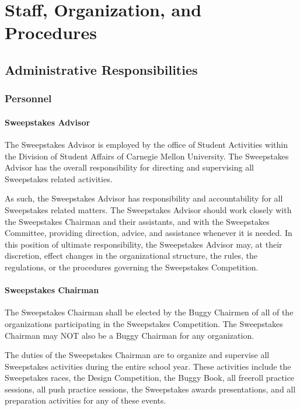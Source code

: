 \chapter{Staff, Organization, and Procedures}

\section{Administrative Responsibilities}

\subsection{Personnel}

\subsubsection{Sweepstakes Advisor}

	The Sweepstakes Advisor is employed by the office of Student Activities within the Division of Student Affairs of Carnegie Mellon University. The Sweepstakes Advisor has the overall responsibility for directing and supervising all Sweepstakes related activities.

	As such, the Sweepstakes Advisor has responsibility and accountability for all Sweepstakes related matters. The Sweepstakes Advisor should work closely with the Sweepstakes Chairman and their assistants, and with the Sweepstakes Committee, providing direction, advice, and assistance whenever it is needed. In this position of ultimate responsibility, the Sweepstakes Advisor may, at their discretion, effect changes in the organizational structure, the rules, the regulations, or the procedures governing the Sweepstakes Competition.

\subsubsection{Sweepstakes Chairman}

	The Sweepstakes Chairman shall be elected by the Buggy Chairmen of all of the organizations participating in the Sweepstakes Competition. The Sweepstakes Chairman may NOT also be a Buggy Chairman for any organization.

	The duties of the Sweepstakes Chairman are to organize and supervise all Sweepstakes activities during the entire school year. These activities include the Sweepstakes races, the Design Competition, the Buggy Book, all freeroll practice sessions, all push practice sessions, the Sweepstakes awards presentations, and all preparation activities for any of these events.

